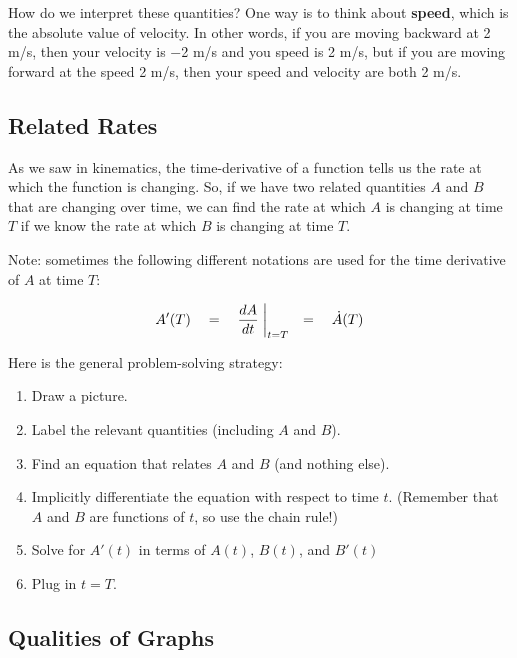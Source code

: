 How do we interpret these quantities? One way is to think about \textbf{speed}, which is the absolute value of velocity. In other words, if you are moving backward at 2 m/s, then your velocity is $-$2 m/s and you speed is 2 m/s, but if you are moving forward at the speed 2 m/s, then your speed and velocity are both 2 m/s.




\subsection{Related Rates}

As we saw in kinematics, the time-derivative of a function tells us the rate at which the function is changing. So, if we have two related quantities $A$ and $B$ that are changing over time, we can find the rate at which $A$ is changing at time $T$ if we know the rate at which $B$ is changing at time $T$.

Note: sometimes the following different notations are used for the time derivative of $A$ at time $T$:

$$A'(T)\quad =\quad \frac{dA}{dt}\biggm\lvert_{t=T}\quad=\quad\dot{A}(T)$$

Here is the general problem-solving strategy:

\begin{strat}
\begin{enumerate}[leftmargin=1em]
\item Draw a picture.
\item Label the relevant quantities (including $A$ and $B$).
\item Find an equation that relates $A$ and $B$ (and nothing else).
\item Implicitly differentiate the equation with respect to time $t$. (Remember that $A$ and $B$ are functions of $t$, so use the chain rule!)
\item Solve for $A'(t)$ in terms of $A(t)$, $B(t)$, and $B'(t)$
\item Plug in $t=T$.
\end{enumerate}
\end{strat}



\subsection{Qualities of Graphs}

